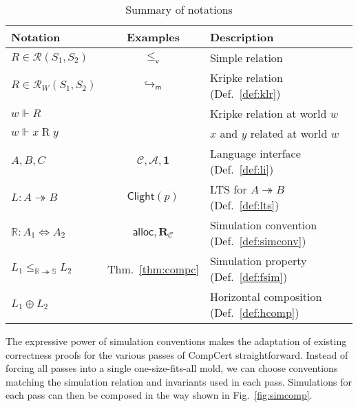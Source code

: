 \documentclass[acmsmall,screen,review,anonymous]{acmart}
\newcommand{\figsize}{\small}
\newcommand{\kw}[1]{\ensuremath{ \mathsf{#1} }}
\newcommand{\que}{\circ}
\newcommand{\ans}{\bullet}
\newcommand{\vref}{\le_\kw{v}}
\begin{document}
\begin{table} %
  \figsize
  \begin{tabular}{lcl}
    \hline
    Notation & Examples & Description \\
    \hline
    $R \in \mathcal{R}(S_1, S_2)$ &
      $\vref$ &
      Simple relation \\
    $R \in \mathcal{R}_W(S_1, S_2)$ &
      $\hookrightarrow_\kw{m}$ &
      Kripke relation (Def.~\ref{def:klr}) \\
    $w \Vdash R$ & &
      Kripke relation at world $w$ \\
    $w \Vdash x \mathrel{R} y$ & &
      $x$ and $y$ related at world $w$ \\
    \hline
    $A, B, C$ &
      $\mathcal{C}, \mathcal{A}, \mathbf{1}$ &
      Language interface (Def.~\ref{def:li}) \\
    $L : A \twoheadrightarrow B$ &
      $\kw{Clight}(p)$ &
      LTS for $A \twoheadrightarrow B$ (Def.~\ref{def:lts}) \\
    $\mathbb{R} : A_1 \Leftrightarrow A_2$ &
      $\kw{alloc}, \mathbf{R}_\mathcal{C}$ &
      Simulation convention (Def.~\ref{def:simconv}) \\
    $L_1 \le_{\mathbb{R} \twoheadrightarrow \mathbb{S}} L_2$ &
      Thm.~\ref{thm:compc} &
      Simulation property (Def.~\ref{def:fsim}) \\
    $L_1 \oplus L_2$ & &
      Horizontal composition (Def.~\ref{def:hcomp}) \\
    \hline
  \end{tabular}
  \caption{Summary of notations}
  \label{tbl:notations}
\end{table}

The expressive power of simulation conventions
makes the adaptation of existing correctness proofs
for the various passes of CompCert straightforward.
Instead of forcing all passes into a single one-size-fits-all mold,
we can choose conventions matching
the simulation relation and invariants
used in each pass.
Simulations for each pass can then be composed
in the way shown in Fig.~\ref{fig:simcomp}.
\end{document}
